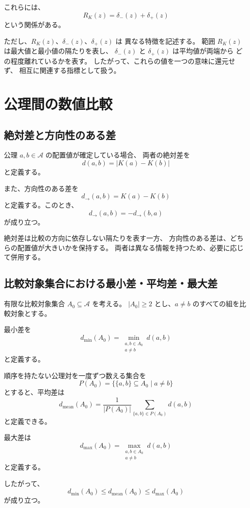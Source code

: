 \documentclass[a4paper,12pt]{article}
\begin{document}
これらには、
\[
    R_K(z)=\delta_-(z)+\delta_+(z)
\]
という関係がある。

ただし、$R_K(z)$、$\delta_-(z)$、$\delta_+(z)$ は
異なる特徴を記述する。
範囲 $R_K(z)$ は最大値と最小値の隔たりを表し、
$\delta_-(z)$ と $\delta_+(z)$ は平均値が両端から
どの程度離れているかを表す。
したがって、これらの値を一つの意味に還元せず、
相互に関連する指標として扱う。

\section{公理間の数値比較}

\subsection{絶対差と方向性のある差}

公理 $a,b\in\mathcal{A}$ の配置値が確定している場合、
両者の絶対差を
\[
    d(a,b)=|K(a)-K(b)|
\]
と定義する。

また、方向性のある差を
\[
    d_{\to}(a,b)=K(a)-K(b)
\]
と定義する。このとき、
\[
    d_{\to}(a,b)=-d_{\to}(b,a)
\]
が成り立つ。

絶対差は比較の方向に依存しない隔たりを表す一方、
方向性のある差は、どちらの配置値が大きいかを保持する。
両者は異なる情報を持つため、必要に応じて併用する。

\subsection{比較対象集合における最小差・平均差・最大差}

有限な比較対象集合 $A_0\subseteq\mathcal{A}$ を考える。
$|A_0|\geq2$ とし、$a\ne b$ のすべての組を比較対象とする。

最小差を
\[
    d_{\min}(A_0)
    =
    \min_{\substack{a,b\in A_0\\a\ne b}}d(a,b)
\]
と定義する。

順序を持たない公理対を一度ずつ数える集合を
\[
    P(A_0)
    =
    \bigl\{\{a,b\}\subseteq A_0\mid a\ne b\bigr\}
\]
とすると、平均差は
\[
    d_{\mathrm{mean}}(A_0)
    =
    \frac{1}{|P(A_0)|}
    \sum_{\{a,b\}\in P(A_0)}d(a,b)
\]
と定義できる。

最大差は
\[
    d_{\max}(A_0)
    =
    \max_{\substack{a,b\in A_0\\a\ne b}}d(a,b)
\]
と定義する。

したがって、
\[
    d_{\min}(A_0)
    \leq d_{\mathrm{mean}}(A_0)
    \leq d_{\max}(A_0)
\]
が成り立つ。
\end{document}
